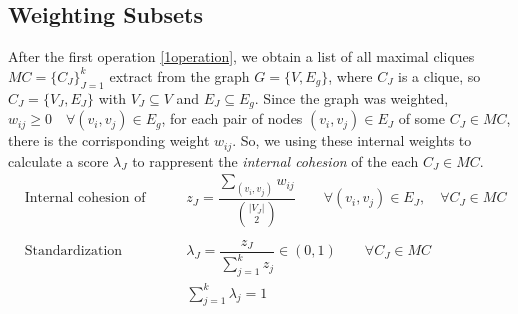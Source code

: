 \documentclass[10pt]{article} %
\begin{document}
\subsection{Weighting Subsets}
\label{Model}
After the first operation \ref{1operation}, we obtain a list of all maximal cliques $MC = \{C_{J}\}_{J=1}^{k}$ extract from the graph $G = \{V, E_{g}\}$, where $C_{J}$ is a clique, so $C_{J}= \{V_{J}, E_{J}\}$ with $V_{J}\subseteq V$ and $E_{J} \subseteq E_{g}$. Since the graph was weighted, $w_{ij} \ge 0\quad \forall (v_i,v_j)\in E_{g}$, for each pair of nodes $(v_{i}, v_{j})\in E_{J}$ of some $C_{J}\in MC$, there is the corrisponding weight $w_{ij}$. So, we using these internal weights to calculate a score $\lambda_{J}$ to rappresent the \textit{internal cohesion} of the each $C_{J}\in MC$.
\begin{align}
     & \text{Internal cohesion of each clique} && z_{J} = \dfrac{\sum_{(v_{i}, v_{j})} w_{ij}}{\binom{|V_{J}|}{2}}\qquad \forall (v_{i}, v_{j}) \in E_{J}, \quad\forall C_{J} \in MC\\ \\
     & \text{Standardization} && \lambda_{J} = \dfrac{z_{J}}{\sum_{j=1}^{k} z_j} \in (0,1)\qquad \forall C_{J} \in MC \\
     &&&\sum_{j = 1}^{k} \lambda_{j} = 1
\end{align}
\end{document}
